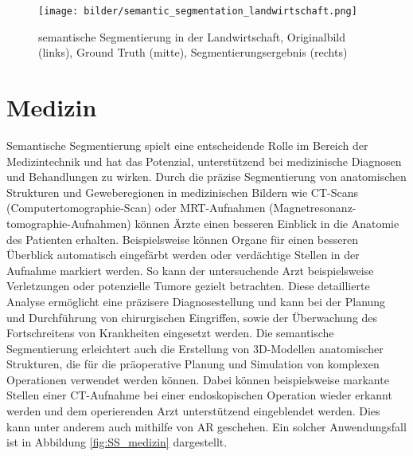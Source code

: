 \begin{figure}[h]
    \centering
    \texttt{[image: bilder/semantic\_segmentation\_landwirtschaft.png]}
    \captionsetup{font=small} %
    \caption[semantische Segmentierung in der Landwirtschaft]{semantische Segmentierung in der Landwirtschaft, Originalbild (links), Ground Truth (mitte), Segmentierungsergebnis (rechts) \cite{madokoro2022semantic}}
    \label{fig:SS_landwirtschaft}
\end{figure}

\section{Medizin}
Semantische Segmentierung spielt eine entscheidende Rolle im Bereich der
Medizintechnik und hat das Potenzial, unterstützend bei medizinische Diagnosen
und Behandlungen zu wirken. Durch die präzise Segmentierung von anatomischen
Strukturen und Geweberegionen in medizinischen Bildern wie CT-Scans
(Computertomographie-Scan) oder MRT-Aufnahmen
(Magnetresonanz-tomographie-Aufnahmen) können Ärzte einen besseren Einblick in
die Anatomie des Patienten erhalten. Beispielsweise können Organe für einen
besseren Überblick automatisch eingefärbt werden oder verdächtige Stellen in
der Aufnahme markiert werden. So kann der untersuchende Arzt beispielsweise
Verletzungen oder potenzielle Tumore gezielt betrachten. Diese detaillierte
Analyse ermöglicht eine präzisere Diagnosestellung und kann bei der Planung und
Durchführung von chirurgischen Eingriffen, sowie der Überwachung des
Fortschreitens von Krankheiten eingesetzt werden. Die semantische Segmentierung
erleichtert auch die Erstellung von 3D-Modellen anatomischer Strukturen, die
für die präoperative Planung und Simulation von komplexen Operationen verwendet
werden können. Dabei können beispielsweise markante Stellen einer CT-Aufnahme
bei einer endoskopischen Operation wieder erkannt werden und dem operierenden
Arzt unterstützend eingeblendet werden. Dies kann unter anderem auch mithilfe
von AR geschehen. Ein solcher Anwendungsfall ist in Abbildung
\ref{fig:SS_medizin} dargestellt. \cite{asgari2021deep,tanzi2021real}

